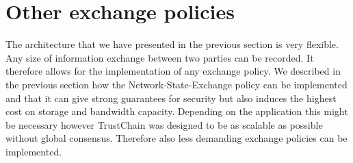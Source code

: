 



\section{Other exchange policies}
\label{sec:system_trust}
The architecture that we have presented in the previous section is very flexible. Any size of information 
exchange between two parties can be recorded. It therefore allows for the implementation of any 
exchange policy. We described in the previous section how the Network-State-Exchange policy can be implemented
and that it can give strong guarantees for security but also induces the highest cost on storage and bandwidth 
capacity. Depending on the application this might be necessary however TrustChain was designed to 
be as scalable as possible without global consensus. Therefore also less demanding exchange policies
can be implemented.

